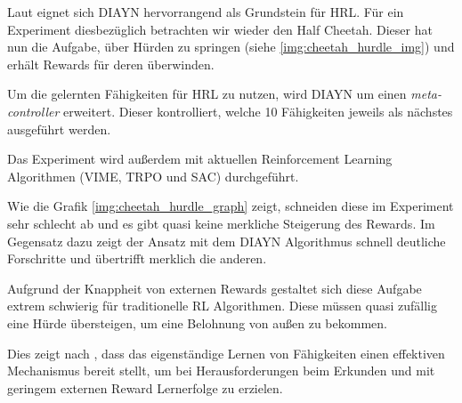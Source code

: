 Laut \cite{diversity_eysenbach} eignet sich DIAYN hervorrangend als Grundstein für HRL. Für ein Experiment diesbezüglich betrachten wir wieder den Half Cheetah. Dieser hat nun die Aufgabe, über Hürden zu springen (siehe \ref{img:cheetah_hurdle_img}) und erhält Rewards für deren überwinden.

Um die gelernten Fähigkeiten für HRL zu nutzen, wird DIAYN um einen \textit{meta-controller} erweitert. Dieser kontrolliert, welche 10 Fähigkeiten jeweils als nächstes ausgeführt werden.

Das Experiment wird außerdem mit aktuellen Reinforcement Learning Algorithmen (VIME, TRPO und SAC) durchgeführt.

Wie die Grafik \ref{img:cheetah_hurdle_graph} zeigt, schneiden diese im Experiment sehr schlecht ab und es gibt quasi keine merkliche Steigerung des Rewards. Im Gegensatz dazu zeigt der Ansatz mit dem DIAYN Algorithmus schnell deutliche Forschritte und übertrifft merklich die anderen.

Aufgrund der Knappheit von externen Rewards gestaltet sich diese Aufgabe extrem schwierig für traditionelle RL Algorithmen. Diese müssen quasi zufällig eine Hürde übersteigen, um eine Belohnung von außen zu bekommen.

Dies zeigt nach \cite{diversity_eysenbach}, dass das eigenständige Lernen von Fähigkeiten einen effektiven Mechanismus bereit stellt, um bei Herausforderungen beim Erkunden und mit geringem externen Reward Lernerfolge zu erzielen.
